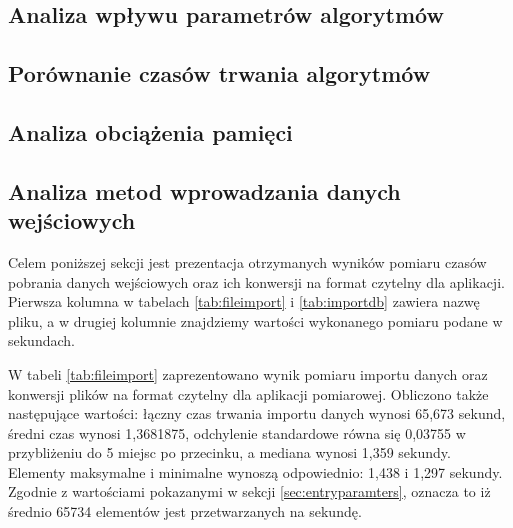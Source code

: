 \subsection{Analiza wpływu parametrów algorytmów}
\label{ssec:queryparameters}
\subsection{Porównanie czasów trwania algorytmów}
\label{ssec:times}
\subsection{Analiza obciążenia pamięci}
\label{ssec:memory}
\newpage
\subsection{Analiza metod wprowadzania danych wejściowych}
\label{ssec:entrydata}
Celem poniższej sekcji jest prezentacja otrzymanych wyników pomiaru czasów pobrania danych wejściowych oraz ich konwersji na format czytelny dla aplikacji. Pierwsza kolumna w tabelach \ref{tab:fileimport} i \ref{tab:importdb} zawiera nazwę pliku, a w drugiej kolumnie znajdziemy wartości wykonanego pomiaru podane w sekundach.\par
W tabeli \ref{tab:fileimport} zaprezentowano wynik pomiaru importu danych oraz konwersji plików na format czytelny dla aplikacji pomiarowej. Obliczono także następujące wartości: łączny czas trwania importu danych wynosi 65,673 sekund, średni czas wynosi 1,3681875, odchylenie standardowe równa się 0,03755 w przybliżeniu do 5 miejsc po przecinku, a mediana wynosi 1,359 sekundy. Elementy maksymalne i minimalne wynoszą odpowiednio: 1,438 i
1,297 sekundy. Zgodnie z wartościami pokazanymi w sekcji \ref{sec:entryparamters}, oznacza to iż średnio 65734 elementów jest przetwarzanych na sekundę.
